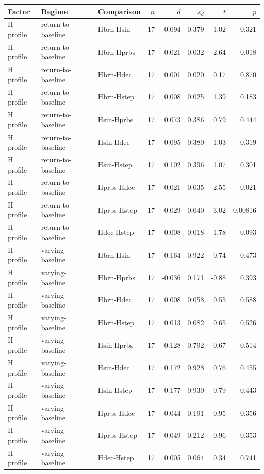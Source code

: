 \begin{tabular}{lllrrrrr}
\toprule
Factor & Regime & Comparison & \(n\) & \(\bar{d}\) & \(s_d\) & \(t\) & \(p\) \\
\midrule
H profile & return-to-baseline & Hbrn-Hsin & 17 & -0.094 & 0.379 & -1.02 & 0.321 \\
H profile & return-to-baseline & Hbrn-Hprbs & 17 & -0.021 & 0.032 & -2.64 & 0.018 \\
H profile & return-to-baseline & Hbrn-Hdec & 17 & 0.001 & 0.020 & 0.17 & 0.870 \\
H profile & return-to-baseline & Hbrn-Hstep & 17 & 0.008 & 0.025 & 1.39 & 0.183 \\
H profile & return-to-baseline & Hsin-Hprbs & 17 & 0.073 & 0.386 & 0.79 & 0.444 \\
H profile & return-to-baseline & Hsin-Hdec & 17 & 0.095 & 0.380 & 1.03 & 0.319 \\
H profile & return-to-baseline & Hsin-Hstep & 17 & 0.102 & 0.396 & 1.07 & 0.301 \\
H profile & return-to-baseline & Hprbs-Hdec & 17 & 0.021 & 0.035 & 2.55 & 0.021 \\
H profile & return-to-baseline & Hprbs-Hstep & 17 & 0.029 & 0.040 & 3.02 & 0.00816 \\
H profile & return-to-baseline & Hdec-Hstep & 17 & 0.008 & 0.018 & 1.78 & 0.093 \\
H profile & varying-baseline & Hbrn-Hsin & 17 & -0.164 & 0.922 & -0.74 & 0.473 \\
H profile & varying-baseline & Hbrn-Hprbs & 17 & -0.036 & 0.171 & -0.88 & 0.393 \\
H profile & varying-baseline & Hbrn-Hdec & 17 & 0.008 & 0.058 & 0.55 & 0.588 \\
H profile & varying-baseline & Hbrn-Hstep & 17 & 0.013 & 0.082 & 0.65 & 0.526 \\
H profile & varying-baseline & Hsin-Hprbs & 17 & 0.128 & 0.792 & 0.67 & 0.514 \\
H profile & varying-baseline & Hsin-Hdec & 17 & 0.172 & 0.928 & 0.76 & 0.455 \\
H profile & varying-baseline & Hsin-Hstep & 17 & 0.177 & 0.930 & 0.79 & 0.443 \\
H profile & varying-baseline & Hprbs-Hdec & 17 & 0.044 & 0.191 & 0.95 & 0.356 \\
H profile & varying-baseline & Hprbs-Hstep & 17 & 0.049 & 0.212 & 0.96 & 0.353 \\
H profile & varying-baseline & Hdec-Hstep & 17 & 0.005 & 0.064 & 0.34 & 0.741 \\

\end{tabular}
